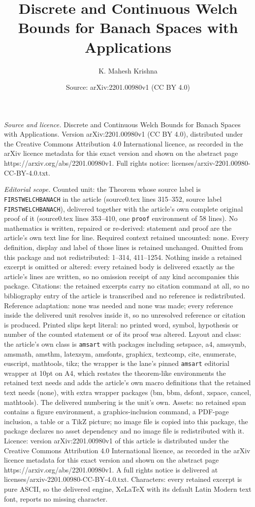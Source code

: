 \documentclass[10pt,a4paper]{amsart}
\title[Discrete and Continuous Welch Bounds for Banach Spaces with ]{Discrete and Continuous Welch Bounds for Banach Spaces with Applications}
\author{K. Mahesh Krishna}
\date{Source: arXiv:2201.00980v1 (CC BY 4.0)}
\begin{document}
\maketitle

\noindent\emph{Source and licence.} Discrete and Continuous Welch Bounds for Banach Spaces with Applications. Version arXiv:2201.00980v1 (CC BY 4.0), distributed under the Creative Commons Attribution 4.0 International licence, as recorded in the arXiv licence metadata for this exact version and shown on the abstract page https://arxiv.org/abs/2201.00980v1. Full rights notice: licenses/arxiv-2201.00980-CC-BY-4.0.txt.\par\smallskip

\noindent\textit{Editorial scope.} Counted unit: the Theorem whose source label is \texttt{FIRSTWELCHBANACH} in the article (source0.tex lines 315--352, source label \texttt{FIRSTWELCHBANACH}), delivered together with the article's own complete original proof of it (source0.tex lines 353--410, one \texttt{proof} environment of 58 lines). No mathematics is written, repaired or re-derived: statement and proof are the article's own text line for line. Required context retained uncounted: none. Every definition, display and label of those lines is retained unchanged. Omitted from this package and not redistributed: 1--314, 411--1254. Nothing inside a retained excerpt is omitted or altered: every retained body is delivered exactly as the article's lines are written, so no omission receipt of any kind accompanies this package. Citations: the retained excerpts carry no citation command at all, so no bibliography entry of the article is transcribed and no reference is redistributed. Reference adaptation: none was needed and none was made; every reference inside the delivered unit resolves inside it, so no unresolved reference or citation is produced. Printed slips kept literal: no printed word, symbol, hypothesis or number of the counted statement or of its proof was altered. Layout and class: the article's own class is \texttt{amsart} with packages including setspace, a4, amssymb, amsmath, amsthm, latexsym, amsfonts, graphicx, textcomp, cite, enumerate, euscript, mathtools, tikz; the wrapper is the lane's pinned \texttt{amsart} editorial wrapper at 10pt on A4, which restates the theorem-like environments the retained text needs and adds the article's own macro definitions that the retained text needs (none), with extra wrapper packages (bm, bbm, dsfont, xspace, cancel, mathtools). The delivered numbering is the unit's own. Assets: no retained span contains a figure environment, a graphics-inclusion command, a PDF-page inclusion, a table or a TikZ picture; no image file is copied into this package, the package declares no asset dependency and no image file is redistributed with it. Licence: version arXiv:2201.00980v1 of this article is distributed under the Creative Commons Attribution 4.0 International licence, as recorded in the arXiv licence metadata for this exact version and shown on the abstract page https://arxiv.org/abs/2201.00980v1. A full rights notice is delivered at licenses/arxiv-2201.00980-CC-BY-4.0.txt. Characters: every retained excerpt is pure ASCII, so the delivered engine, XeLaTeX with its default Latin Modern text font, reports no missing character.
\end{document}
